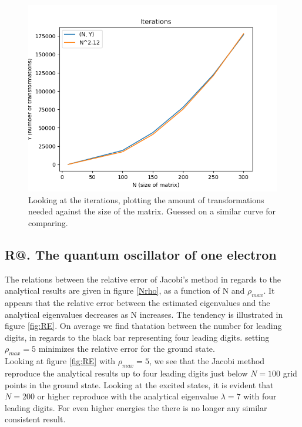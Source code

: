 \documentclass[%
reprint,
amsmath, 
amssymb, 
aps,]{revtex4-1}
\makeatletter
\newcommand*{\rom}[1]{\expandafter\@slowromancap\romannumeral #1@}
\makeatother
\begin{document}
\begin{figure}
\centering
\includegraphics[scale = 0.6]{iterations.png}
\caption{Looking at the iterations, plotting the amount of transformations needed against the size of the matrix. Guessed on a similar curve for comparing.}
\label{fig:my_label2}
\end{figure}

		\subsection*{R\rom{2}. The quantum oscillator of one electron} \noindent 
The relations between the relative error of Jacobi's method in regards to the analytical results are given in figure \ref{Nrho}, as a function of N and $\rho_{max}$. It appears that the relative error between the estimated eigenvalues and the analytical eigenvalues decreases as N increases. The tendency is illustrated in figure \ref{fig:RE}. On average we find thatation between the number for leading digits, in regards to the black bar representing four leading digits. setting $\rho_{max} = 5$ minimizes the relative error for the ground state. \\ \indent 
Looking at figure \ref{fig:RE} with $\rho_{max} = 5$, we see that the Jacobi method reproduce the analytical results up to four leading digits just below $N=100$ grid points in the ground state. Looking at the excited states, it is evident that $N=200$  or higher reproduce with the analytical eigenvalue $\lambda = 7$ with four leading digits. For even higher energies the there is no longer any similar consistent result. \\
\end{document}
